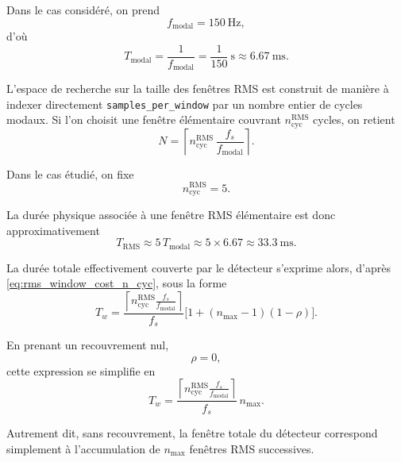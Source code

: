 \documentclass[12pt,a4paper, openany]{book}
\begin{document}
Dans le cas considéré, on prend
\begin{equation}
f_{\mathrm{modal}} = 150~\mathrm{Hz},
\end{equation}
d'où
\begin{equation}
T_{\mathrm{modal}} = \frac{1}{f_{\mathrm{modal}}}
= \frac{1}{150}~\mathrm{s}
\approx 6.67~\mathrm{ms}.
\end{equation}

L'espace de recherche sur la taille des fenêtres RMS est construit de manière à indexer directement \texttt{samples\_per\_window} par un nombre entier de cycles modaux. Si l'on choisit une fenêtre élémentaire couvrant $n_{\mathrm{cyc}}^{\mathrm{RMS}}$ cycles, on retient
\begin{equation}
N = \left\lceil n_{\mathrm{cyc}}^{\mathrm{RMS}}\,\frac{f_s}{f_{\mathrm{modal}}}\right\rceil.
\label{eq:n_case_rms}
\end{equation}

Dans le cas étudié, on fixe
\begin{equation}
n_{\mathrm{cyc}}^{\mathrm{RMS}} = 5.
\end{equation}

La durée physique associée à une fenêtre RMS élémentaire est donc approximativement
\begin{equation}
T_{\mathrm{RMS}}
\approx 5\,T_{\mathrm{modal}}
\approx 5 \times 6.67
\approx 33.3~\mathrm{ms}.
\end{equation}

La durée totale effectivement couverte par le détecteur s'exprime alors, d'après \eqref{eq:rms_window_cost_n_cyc}, sous la forme
\begin{equation}
T_w =
\frac{
\left\lceil
n_{\mathrm{cyc}}^{\mathrm{RMS}}
\frac{f_s}{f_{\mathrm{modal}}}
\right\rceil
}{f_s}
\bigl[1+(n_{\max}-1)(1-\rho)\bigr].
\label{eq:rms_window_case}
\end{equation}

En prenant un recouvrement nul,
\begin{equation}
\rho = 0,
\end{equation}
cette expression se simplifie en
\begin{equation}
T_w =
\frac{
\left\lceil
n_{\mathrm{cyc}}^{\mathrm{RMS}}
\frac{f_s}{f_{\mathrm{modal}}}
\right\rceil
}{f_s}\,n_{\max}.
\end{equation}

Autrement dit, sans recouvrement, la fenêtre totale du détecteur correspond simplement à l'accumulation de $n_{\max}$ fenêtres RMS successives.
\end{document}
